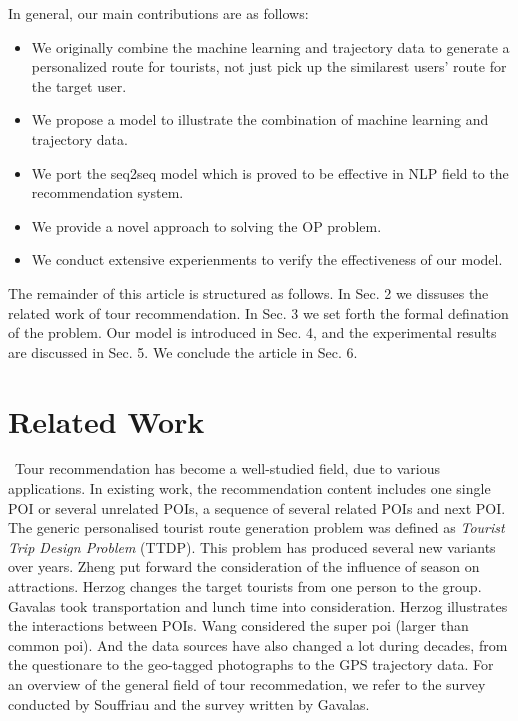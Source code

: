 \documentclass[runningheads]{llncs}
\begin{document}
In general, our main contributions are as follows:
\begin{itemize}
	\item We originally combine the machine learning and trajectory data to generate a personalized route for tourists, not just pick up the similarest users' route for the target user.
	\item We propose a model to illustrate the combination of machine learning and trajectory data.
	\item We port the seq2seq model which is proved to be effective in NLP field to the recommendation system.
	\item We provide a novel approach to solving the OP problem.
	\item We conduct extensive experienments to verify the effectiveness of our model.
\end{itemize}

The remainder of this article is structured as follows. In Sec. 2 we dissuses the related work of tour recommendation. In Sec. 3 we set forth the formal defination of the problem. Our model is introduced in Sec. 4, and the experimental results are discussed in Sec. 5. We conclude the article in Sec. 6.

\section{Related Work}
\quad\, Tour recommendation has become a well-studied field, due to various applications\cite{8509321, 10.1007/978-3-319-91452-7_45}. In existing work, the recommendation content includes one single POI or several unrelated POIs\cite{AAAI159560}, a sequence of several related POIs\cite{doi:10.1080/13658816.2018.1458988} and next POI\cite{doi:10.1111/tgis.12248}. The generic personalised tourist route generation problem was defined as \emph{Tourist Trip Design Problem} (TTDP)\cite{Vansteenwegen2007}. This problem has produced several new variants over years. Zheng\cite{zheng2017using} put forward the consideration of the influence of season on attractions. Herzog\cite{herzog2017recommending} changes the target tourists from one person to the group. Gavalas\cite{gavalas2015ecompass} took transportation and lunch time into consideration. Herzog\cite{herzog2016exploiting} illustrates the interactions between POIs. Wang\cite{wang2018etour} considered the super poi (larger than common poi). And the data sources have also changed a lot during decades, from the questionare to the geo-tagged photographs\cite{SUN2015110} to the GPS trajectory data\cite{10.1007/978-3-319-91452-7_45, 8509321}. For an overview of the general field of tour recommedation, we refer to the survey conducted by Souffriau\cite{souffriau2010tourist} and the survey written by Gavalas\cite{gavalas2014survey}.
\end{document}
